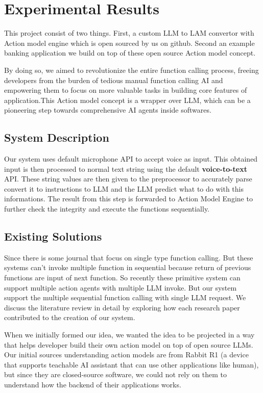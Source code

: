 \chapter{Experimental Results}


This project consist of two things. First, a custom LLM to LAM convertor with Action model engine which is open sourced by us on github. Second an example banking application we build on top of these open source Action model concept. 

By doing so, we aimed to revolutionize the entire function calling process, freeing developers from the burden of tedious manual function calling AI and empowering them to focus on more valuable tasks in building core features of application.This Action model concept is a wrapper over LLM, which can be a pioneering step towards comprehensive AI agents inside softwares.

\section{System Description}

Our system uses default microphone API to accept voice as input. This obtained input is then processed to normal text string using the default \textbf{voice-to-text} API. These string values are then given to the preprocessor to accurately parse convert it to instructions to LLM and the LLM predict what to do with this informations. The result from this step is forwarded to Action Model Engine to further check the integrity and execute the functions sequentially.

\section{Existing Solutions}

\noindent
Since there is some journal that focus on single type function calling. But these systems can't invoke multiple function in sequential because return of previous functions are input of next function. So recently these primitive system can support multiple action agents with multiple LLM invoke. But our system support the multiple sequential function calling with single LLM request. We discuss the literature review in detail by exploring how each research paper contributed to the creation of our system.

\noindent
When we initially formed our idea, we wanted the idea to be projected in a way that helps developer build their own action model on top of open source LLMs. Our initial sources understanding action models are from Rabbit R1 (a device that supports teachable AI assistant that can use other applications like human), but since they are closed-source software, we could not rely on them to understand how the backend of their applications works.

